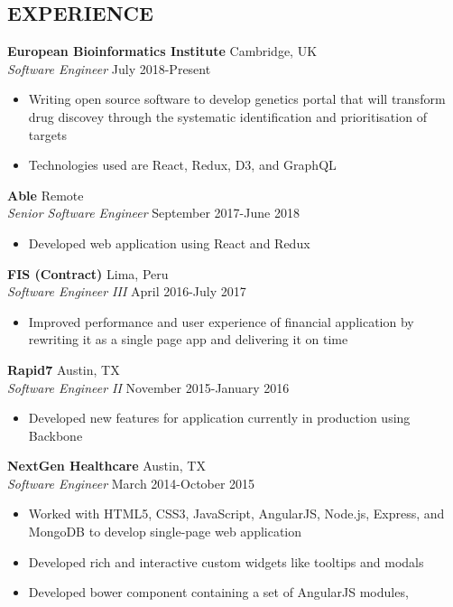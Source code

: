 \documentclass[line,margin,letterpaper]{res}
\begin{document}
\begin{resume}
\section{EXPERIENCE}
  {\bf European Bioinformatics Institute} \hfill Cambridge, UK \\
  \emph{Software Engineer} \hfill July 2018-Present
  \begin{itemize} \itemsep -2pt
    \item Writing open source software to develop genetics portal that will
    transform drug discovey through the systematic identification and
    prioritisation of targets
    \item Technologies used are React, Redux, D3, and GraphQL
  \end{itemize}
  {\bf Able} \hfill Remote \\
  \emph{Senior Software Engineer} \hfill September 2017-June 2018
  \begin{itemize} \itemsep -2pt
    \item Developed web application using React and Redux
  \end{itemize}
  {\bf FIS (Contract)} \hfill Lima, Peru \\
  \emph{Software Engineer III} \hfill April 2016-July 2017
  \begin{itemize} \itemsep -2pt
    \item Improved performance and user experience of financial application by
    rewriting it as a single page app and delivering it on time
  \end{itemize}
  {\bf Rapid7} \hfill Austin, TX \\
  \emph{Software Engineer II} \hfill November 2015-January 2016
  \begin{itemize} \itemsep -2pt
    \item Developed new features for application currently in production
    using Backbone
  \end{itemize}
  {\bf NextGen Healthcare} \hfill Austin, TX \\
  \emph{Software Engineer} \hfill March 2014-October 2015
  \begin{itemize} \itemsep -2pt
    \item Worked with HTML5, CSS3, JavaScript, AngularJS, Node.js, Express, and
    MongoDB to develop single-page web application
    \item Developed rich and interactive custom widgets like tooltips and
    modals
    \item Developed bower component containing a set of AngularJS modules,

\end{itemize}
\end{resume}
\end{document}
